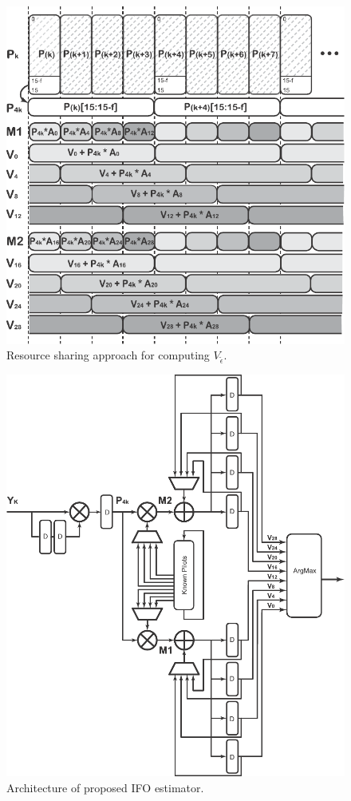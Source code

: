 \begin{figure}
	\centerline{\includegraphics [width=1\columnwidth] {figures/Subsampling.pdf} }
	\caption{Resource sharing approach for computing $V_{\tilde{\epsilon}}$.}
	\label{fig:subsampling}
\end{figure}


\begin{figure}
	\centerline{\includegraphics [width=0.95\columnwidth] {figures/ProposedStruc2.pdf} }
	\caption{Architecture of proposed IFO estimator.}
	\label{fig:ProposedStruc}
\end{figure}

